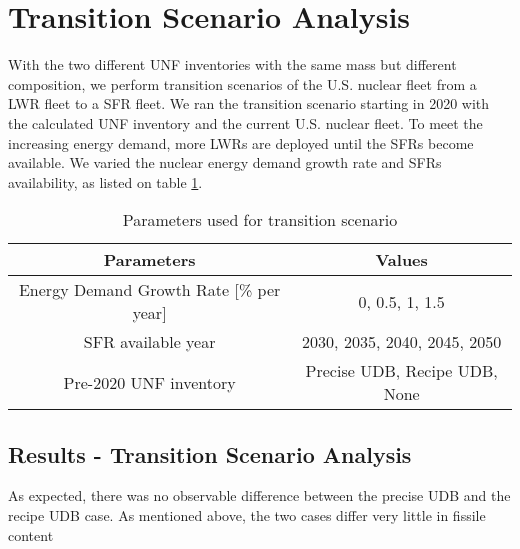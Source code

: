 \section{Transition Scenario Analysis}
With the two different \gls{UNF} inventories with
the same mass but different composition, we perform
transition scenarios of the U.S. nuclear fleet from
a \gls{LWR} fleet to a \gls{SFR} fleet. We ran the
transition scenario starting in 2020 with the calculated
\gls{UNF} inventory and the current U.S. nuclear fleet.
To meet the increasing energy demand, more \glspl{LWR}
are deployed until the \glspl{SFR} become available.
We varied the nuclear energy demand growth rate and
\glspl{SFR} availability, as listed on table \ref{tab:param}.


\begin{table}[h]
    \centering
    \begin{tabular}{cc}
        \hline
        Parameters & Values \\
        \hline
        Energy Demand Growth Rate [\% per year] & 0, 0.5, 1, 1.5 \\
        \gls{SFR} available year & 2030, 2035, 2040, 2045, 2050\\
        Pre-2020 \gls{UNF} inventory & Precise \gls{UDB}, Recipe \gls{UDB}, None \\
        \hline
    \end{tabular}
    \caption{Parameters used for transition scenario}
    \label{tab:param}
\end{table}


\subsection{Results - Transition Scenario Analysis}
As expected, there was no observable difference between the
precise \gls{UDB} and the recipe \gls{UDB} case. As mentioned
above, the two cases differ very little in fissile content


